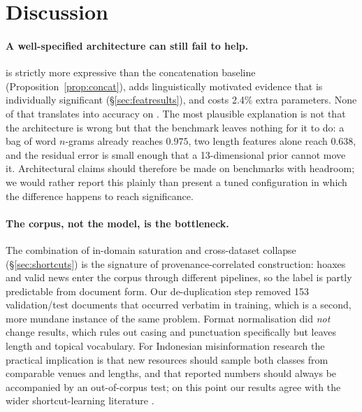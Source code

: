 \section{Discussion}
\label{sec:discussion}

\paragraph{A well-specified architecture can still fail to help.}
\menet{} is strictly more expressive than the concatenation baseline (Proposition~\ref{prop:concat}), adds
linguistically motivated evidence that is individually significant (\S\ref{sec:featresults}), and costs
2.4\% extra parameters. None of that translates into accuracy on \iph{}. The most plausible explanation is
not that the architecture is wrong but that the benchmark leaves nothing for it to do: a bag of word
$n$-grams already reaches $0.975$, two length features alone reach $0.638$, and the residual error is
small enough that a 13-dimensional prior cannot move it. Architectural claims should therefore be made on
benchmarks with headroom; we would rather report this plainly than present a tuned configuration in which
the difference happens to reach significance.

\paragraph{The corpus, not the model, is the bottleneck.}
The combination of in-domain saturation and cross-dataset collapse (\S\ref{sec:shortcuts}) is the
signature of provenance-correlated construction: hoaxes and valid news enter the corpus through different
pipelines, so the label is partly predictable from document form. Our de-duplication step removed 153
validation/test documents that occurred verbatim in training, which is a second, more mundane instance of
the same problem. Format normalisation did \emph{not} change results, which rules out casing and
punctuation specifically but leaves length and topical vocabulary. For Indonesian misinformation research
the practical implication is that new resources should sample both classes from comparable venues and
lengths, and that reported numbers should always be accompanied by an out-of-corpus test; on this point
our results agree with the wider shortcut-learning literature
\citep{gururangan2018annotation,mccoy2019right,geirhos2020shortcut}.

